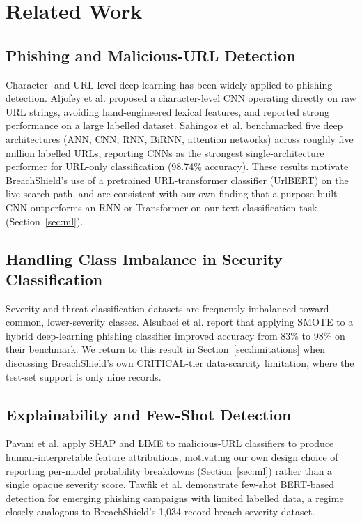 \documentclass[conference]{IEEEtran}
\begin{document}
\section{Related Work}

\subsection{Phishing and Malicious-URL Detection}
Character- and URL-level deep learning has been widely applied to phishing detection. Aljofey et al. \cite{aljofey2020effective} proposed a character-level CNN operating directly on raw URL strings, avoiding hand-engineered lexical features, and reported strong performance on a large labelled dataset. Sahingoz et al. \cite{sahingoz2024dephides} benchmarked five deep architectures (ANN, CNN, RNN, BiRNN, attention networks) across roughly five million labelled URLs, reporting CNNs as the strongest single-architecture performer for URL-only classification (98.74\% accuracy). These results motivate BreachShield's use of a pretrained URL-transformer classifier (UrlBERT) on the live search path, and are consistent with our own finding that a purpose-built CNN outperforms an RNN or Transformer on our text-classification task (Section~\ref{sec:ml}).

\subsection{Handling Class Imbalance in Security Classification}
Severity and threat-classification datasets are frequently imbalanced toward common, lower-severity classes. Alsubaei et al. \cite{alsubaei2024enhancing} report that applying SMOTE to a hybrid deep-learning phishing classifier improved accuracy from 83\% to 98\% on their benchmark. We return to this result in Section~\ref{sec:limitations} when discussing BreachShield's own CRITICAL-tier data-scarcity limitation, where the test-set support is only nine records.

\subsection{Explainability and Few-Shot Detection}
Pavani et al. \cite{pavani2024enhancing} apply SHAP and LIME to malicious-URL classifiers to produce human-interpretable feature attributions, motivating our own design choice of reporting per-model probability breakdowns (Section~\ref{sec:ml}) rather than a single opaque severity score. Tawfik et al. \cite{tawfik2025explainable} demonstrate few-shot BERT-based detection for emerging phishing campaigns with limited labelled data, a regime closely analogous to BreachShield's 1,034-record breach-severity dataset.
\end{document}
